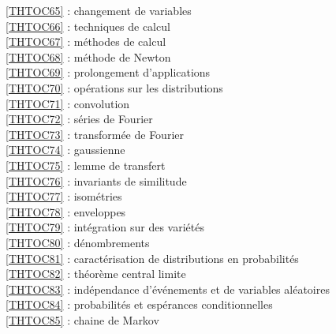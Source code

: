 \ref {THTOC65} : changement de variables\\
\ref {THTOC66} : techniques de calcul\\
\ref {THTOC67} : méthodes de calcul\\
\ref {THTOC68} : méthode de Newton\\
\ref {THTOC69} : prolongement d'applications\\
\ref {THTOC70} : opérations sur les distributions\\
\ref {THTOC71} : convolution\\
\ref {THTOC72} : séries de Fourier\\
\ref {THTOC73} : transformée de Fourier\\
\ref {THTOC74} : gaussienne\\
\ref {THTOC75} : lemme de transfert\\
\ref {THTOC76} : invariants de similitude\\
\ref {THTOC77} : isométries\\
\ref {THTOC78} : enveloppes\\
\ref {THTOC79} : intégration sur des variétés\\
\ref {THTOC80} : dénombrements\\
\ref {THTOC81} : caractérisation de distributions en probabilités\\
\ref {THTOC82} : théorème central limite\\
\ref {THTOC83} : indépendance d'événements et de variables aléatoires\\
\ref {THTOC84} : probabilités et espérances conditionnelles\\
\ref {THTOC85} : chaine de Markov\\
